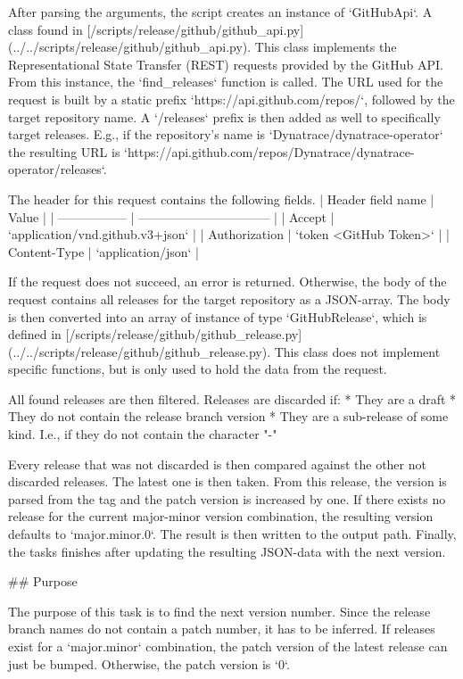 After parsing the arguments, the script creates an instance of `GitHubApi`.
A class found in [/scripts/release/github/github_api.py](../../scripts/release/github/github_api.py).
This class implements the Representational State Transfer (REST) requests provided by the GitHub API.
From this instance, the `find_releases` function is called.
The URL used for the request is built by a static prefix `https://api.github.com/repos/`, followed by the target repository name.
A `/releases` prefix is then added as well to specifically target releases.
E.g., if the repository's name is `Dynatrace/dynatrace-operator` the resulting URL is `https://api.github.com/repos/Dynatrace/dynatrace-operator/releases`.

The header for this request contains the following fields.
| Header field name | Value                            |
| ----------------- | -------------------------------- |
| Accept            | `application/vnd.github.v3+json` |
| Authorization     | `token <GitHub Token>`           |
| Content-Type      | `application/json`               |

If the request does not succeed, an error is returned.
Otherwise, the body of the request contains all releases for the target repository as a JSON-array.
The body is then converted into an array of instance of type `GitHubRelease`, which is defined in [/scripts/release/github/github_release.py](../../scripts/release/github/github_release.py).
This class does not implement specific functions, but is only used to hold the data from the request.

All found releases are then filtered.
Releases are discarded if:
* They are a draft
* They do not contain the release branch version
* They are a sub-release of some kind. I.e., if they do not contain the character "-"

Every release that was not discarded is then compared against the other not discarded releases.
The latest one is then taken.
From this release, the version is parsed from the tag and the patch version is increased by one.
If there exists no release for the current major-minor version combination, the resulting version defaults to `major.minor.0`.
The result is then written to the output path.
Finally, the tasks finishes after updating the resulting JSON-data with the next version.

## Purpose

The purpose of this task is to find the next version number.
Since the release branch names do not contain a patch number, it has to be inferred.
If releases exist for a `major.minor` combination, the patch version of the latest release can just be bumped.
Otherwise, the patch version is `0`.

